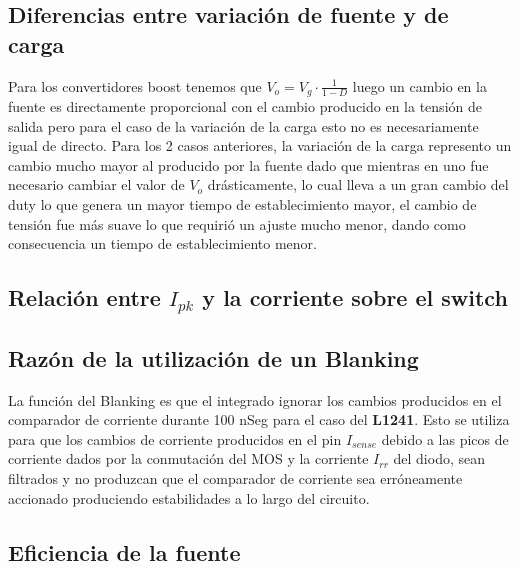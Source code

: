 \documentclass[e4-tp2-main.tex]{subfiles}
\begin{document}
\subsection{Diferencias entre variación de fuente y de carga}
Para los convertidores boost tenemos que $V_o=V_g\cdot\frac{1}{1-D}$ luego un cambio en la fuente es directamente proporcional con el cambio producido en la tensión de salida pero para el caso de la variación de la carga esto no es necesariamente igual de directo. Para los 2 casos anteriores, la variación de la carga represento un cambio mucho mayor al producido por la fuente dado que mientras en uno fue necesario cambiar el valor de $V_o$ drásticamente, lo cual lleva a un gran cambio del duty lo que genera un mayor tiempo de establecimiento mayor, el cambio de tensión fue más suave lo que requirió un ajuste mucho menor, dando como consecuencia un tiempo de establecimiento menor.\\

\subsection{Relación entre $I_{pk}$ y la corriente sobre el switch}

\subsection{Razón de la utilización de un Blanking}
La función del Blanking es que el integrado ignorar los cambios producidos en el comparador de corriente durante 100 nSeg para el caso del \textbf{L1241}. Esto se utiliza para que los cambios de corriente producidos en el pin $I_{sense}$ debido a las picos de corriente dados por la conmutación del MOS y la corriente $I_{rr}$ del diodo, sean filtrados y no produzcan que el comparador de corriente sea erróneamente accionado produciendo estabilidades a lo largo del circuito.\\

\subsection{Eficiencia de la fuente}
\end{document}
